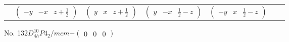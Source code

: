 \documentclass[fleqn,9pt,landscape]{jsarticle}
\begin{document}
\begin{center}
\begin{longtable}{ccccccc}
& $ \begin{pmatrix} - y & - x & z + \frac{1}{2} \end{pmatrix} $ & $ \begin{pmatrix} y & x & z + \frac{1}{2} \end{pmatrix} $ & $ \begin{pmatrix} y & - x & \frac{1}{2} - z \end{pmatrix} $ & $ \begin{pmatrix} - y & x & \frac{1}{2} - z \end{pmatrix} $ & $  $ & $  $ \\
\end{longtable}
\end{center}
\newpage
No. 132\quad$D_{4h}^{10}$\quad$P4_2/mcm$\quad[ tetragonal ]\quad$+\begin{pmatrix} 0 & 0 & 0 \end{pmatrix}$
\end{document}
